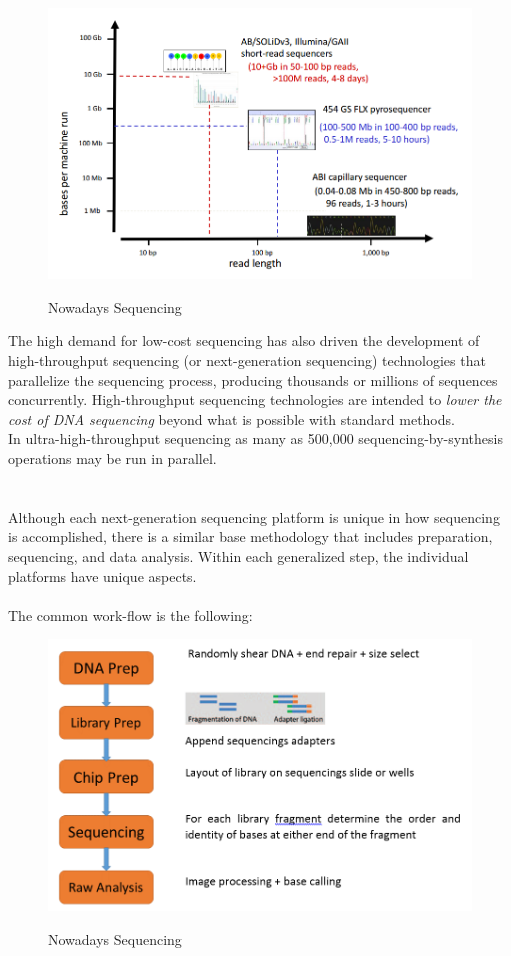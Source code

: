 \vspace{30mm}

\begin{figure}[ht!]
	\centering
	\includegraphics[width=150mm]{../Images/NowadaysSequencing.png}
	\label{overflow}
	\caption{Nowadays Sequencing}
	\end{figure}

The high demand for low-cost sequencing has also driven the development of high-throughput sequencing (or next-generation sequencing) technologies that parallelize the sequencing process, producing thousands or millions of sequences concurrently. High-throughput sequencing technologies are intended to \emph{lower the cost of DNA sequencing} beyond what is possible with standard methods.
\\In ultra-high-throughput sequencing as many as 500,000 sequencing-by-synthesis operations may be run in parallel.
\\
\\
\\Although each next-generation sequencing platform is unique in how sequencing is accomplished, there is a similar base methodology that includes preparation, sequencing, and data analysis. Within each generalized step, the individual platforms have unique aspects.
\\
\\The common work-flow is the following:

\begin{figure}[ht!]
	\centering
	\includegraphics[width=150mm]{../Images/NGSworkflowCommented.png}
	\label{overflow}
	\caption{Nowadays Sequencing}
	\end{figure}


